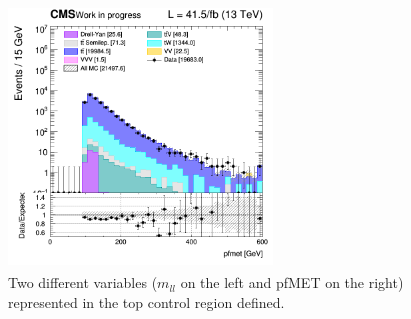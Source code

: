 \documentclass[a4paper, 10pt, openright]{report}
\begin{document}
\begin{figure}[htbp]
{\begin{minipage}[b]{.48\textwidth}
\end{minipage}\hfill
\begin{minipage}[b]{.48\textwidth}
\includegraphics[width=7cm, height=7cm]{figs/2017/log_cratio_ttbarCR_ll_METcorrected_pt.png}
\end{minipage} \hfill
}
\caption{Two different variables ($m_{ll}$ on the left and pf\ac{MET} on the right) represented in the top control region defined.}
\label{fig:TopCR}
\end{figure}
\end{document}

